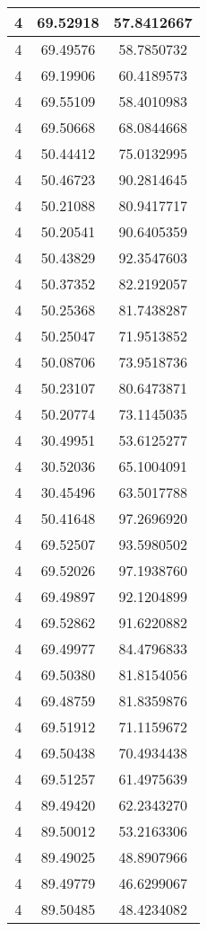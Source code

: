 \documentclass[
]{book}
\begin{document}
\begin{tabular}{c|c|c}
\hline
4 & 69.52918 & 57.8412667\\
\hline
4 & 69.49576 & 58.7850732\\
\hline
4 & 69.19906 & 60.4189573\\
\hline
4 & 69.55109 & 58.4010983\\
\hline
4 & 69.50668 & 68.0844668\\
\hline
4 & 50.44412 & 75.0132995\\
\hline
4 & 50.46723 & 90.2814645\\
\hline
4 & 50.21088 & 80.9417717\\
\hline
4 & 50.20541 & 90.6405359\\
\hline
4 & 50.43829 & 92.3547603\\
\hline
4 & 50.37352 & 82.2192057\\
\hline
4 & 50.25368 & 81.7438287\\
\hline
4 & 50.25047 & 71.9513852\\
\hline
4 & 50.08706 & 73.9518736\\
\hline
4 & 50.23107 & 80.6473871\\
\hline
4 & 50.20774 & 73.1145035\\
\hline
4 & 30.49951 & 53.6125277\\
\hline
4 & 30.52036 & 65.1004091\\
\hline
4 & 30.45496 & 63.5017788\\
\hline
4 & 50.41648 & 97.2696920\\
\hline
4 & 69.52507 & 93.5980502\\
\hline
4 & 69.52026 & 97.1938760\\
\hline
4 & 69.49897 & 92.1204899\\
\hline
4 & 69.52862 & 91.6220882\\
\hline
4 & 69.49977 & 84.4796833\\
\hline
4 & 69.50380 & 81.8154056\\
\hline
4 & 69.48759 & 81.8359876\\
\hline
4 & 69.51912 & 71.1159672\\
\hline
4 & 69.50438 & 70.4934438\\
\hline
4 & 69.51257 & 61.4975639\\
\hline
4 & 89.49420 & 62.2343270\\
\hline
4 & 89.50012 & 53.2163306\\
\hline
4 & 89.49025 & 48.8907966\\
\hline
4 & 89.49779 & 46.6299067\\
\hline
4 & 89.50485 & 48.4234082\\

\end{tabular}
\end{document}
